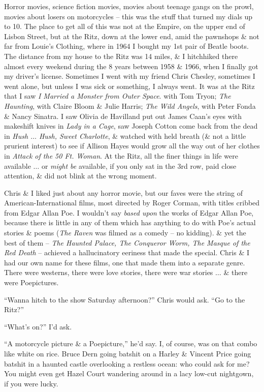 \documentclass{article}
\numberwithin{equation}{section}
\begin{document}
Horror movies, science fiction movies, movies about teenage gangs on the prowl, movies about losers on motorcycles -- this was the stuff that turned my dials up to 10. The place to get all of this was not at the Empire, on the upper end of Lisbon Street, but at the Ritz, down at the lower end, amid the pawnshops \& not far from Louie's Clothing, where in 1964 I bought my 1st pair of Beatle boots. The distance from my house to the Ritz was 14 miles, \& I hitchhiked there almost every weekend during the 8 years between 1958 \& 1966, when I finally got my driver's license. Sometimes I went with my friend Chris Chesley, sometimes I went alone, but unless I was sick or something, I always went. It was at the Ritz that I saw \textit{I Married a Monster from Outer Space}. with Tom Tryon; \textit{The Haunting}, with Claire Bloom \& Julie Harris; \textit{The Wild Angels}, with Peter Fonda \& Nancy Sinatra. I saw Olivia de Havilland put out James Caan's eyes with makeshift knives in \textit{Lady in a Cage}, saw Joseph Cotton come back from the dead in \textit{Hush $\ldots$ Hush, Sweet Charlotte}, \& watched with held breath (\& not a little prurient interest) to see if Allison Hayes would grow all the way out of her clothes in \textit{Attack of the 50 Ft. Woman}. At the Ritz, all the finer things in life were available $\ldots$ or \textit{might be} available, if you only sat in the 3rd row, paid close attention, \& did not blink at the wrong moment.

Chris \& I liked just about any horror movie, but our faves were the string of American-International films, most directed by Roger Corman, with titles cribbed from Edgar Allan Poe. I wouldn't say \textit{based upon} the works of Edgar Allan Poe, because there is little in any of them which has anything to do with Poe's actual stories \& poems (\textit{The Raven} was filmed as a comedy -- no kidding). \& yet the best of them -- \textit{The Haunted Palace, The Conqueror Worm, The Masque of the Red Death} -- achieved a hallucinatory eeriness that made the special. Chris \& I had our own name for these films, one that made them into a separate genre. There were westerns, there were love stories, there were war stories $\ldots$ \& there were Poepictures.

``Wanna hitch to the show Saturday afternoon?'' Chris would ask. ``Go to the Ritz?''

``What's on?'' I'd ask.

``A motorcycle picture \& a Poepicture,'' he'd say. I, of course, was on that combo like white on rice. Bruce Dern going batshit on a Harley \& Vincent Price going batshit in a haunted castle overlooking a restless ocean: who could ask for me? You might even get Hazel Court wandering around in a lacy low-cut nightgown, if you were lucky.
\end{document}
